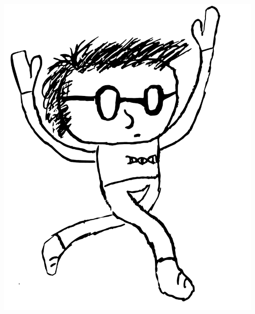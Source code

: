 \begin{frontmatter}
\begin{epigraph}
    \begin{center}
        \includegraphics[scale=0.28]{yoshiki}
    \end{center}

\end{epigraph}

%
\tableofcontents

\renewcommand{\glossarysection}[2][]{
\newpage
\noindent
\centerline{LIST OF ABBREVIATIONS}
\addcontentsline{toc}{chapter}{List of Abbreviations}
}

\printglossary[title=List of Abbreviations,toctitle=List of Abbreviations,nonumberlist ]
\listoffigures  %
\listoftables   %

%
%
\begin{acknowledgements}


\end{acknowledgements}
\end{frontmatter}
